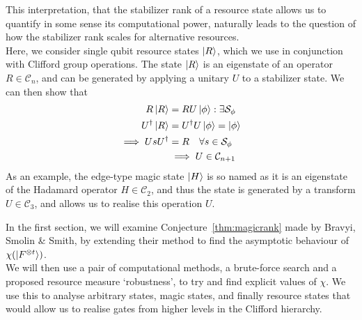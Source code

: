 \documentclass{standalone}
\begin{document}
This interpretation, that the stabilizer rank of a resource state allows us to quantify in some sense its computational power, naturally leads to the question of how the stabilizer rank scales for alternative resources. \\
Here, we consider single qubit resource states $\ket{R}$, which we use in conjunction with Clifford group operations. The state $\ket{R}$ is an eigenstate of an operator $R\in\mathcal{C}_{n}$, and can be generated by applying a unitary $U$ to a stabilizer state. We can then show that
\begin{align}\label{eq:resourcegate}
\begin{split}
R\ket{R} &= R U\ket{\phi} : \exists \mathcal{S}_{\phi} \\
U^{\dagger}\ket{R} &= U^{\dagger}U\ket{\phi} = \ket{\phi}\\
\implies UsU^{\dagger} &= R\quad\forall s\in\mathcal{S}_{\phi}\\
&\implies U \in\mathcal{C}_{n+1} \\
\end{split}
\end{align}
As an example, the edge-type magic state $\ket{H}$ is so named as it is an eigenstate of the Hadamard operator $H\in\mathcal{C}_{2}$, and thus the state is generated by a transform $U\in\mathcal{C}_{3}$, and allows us to realise this operation $U$.
\par
In the first section, we will examine Conjecture~\ref{thm:magicrank} made by Bravyi, Smolin \& Smith, by extending their method to find the asymptotic behaviour of $\chi(\ket{F^{\otimes t}})$. \\
We will then use a pair of computational methods, a brute-force search and a proposed resource measure `robustness', to try and find explicit values of $\chi$. We use this to analyse arbitrary states, magic states, and finally resource states that would allow us to realise gates from higher levels in the Clifford hierarchy.
\end{document}
